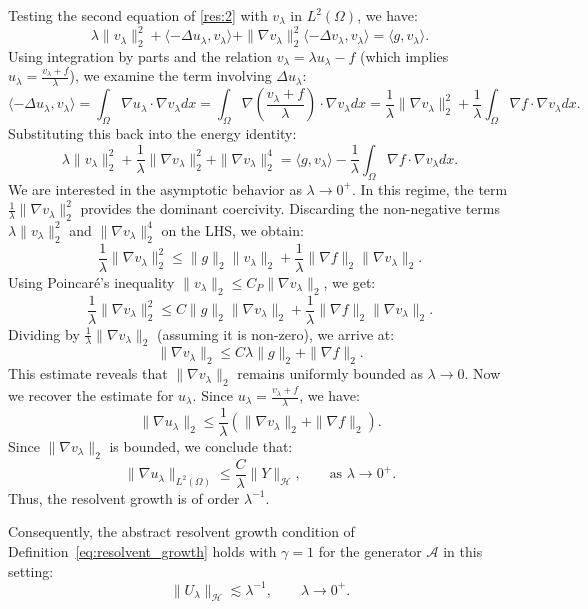 \documentclass[11pt,reqno]{amsart}
\theoremstyle{remark}
\begin{document}
Testing the second equation of \eqref{res:2} with $v_\lambda$ in $L^2(\Omega)$, we have:
\[
\lambda \|v_\lambda\|_2^2 + \langle -\Delta u_\lambda, v_\lambda \rangle + \|\nabla v_\lambda\|_2^2 \langle -\Delta v_\lambda, v_\lambda \rangle = \langle g, v_\lambda \rangle.
\]
Using integration by parts and the relation $v_\lambda = \lambda u_\lambda - f$ (which implies $u_\lambda = \frac{v_\lambda + f}{\lambda}$), we examine the term involving $\Delta u_\lambda$:
\[
\langle -\Delta u_\lambda, v_\lambda \rangle = \int_\Omega \nabla u_\lambda \cdot \nabla v_\lambda dx = \int_\Omega \nabla \left(\frac{v_\lambda+f}{\lambda}\right) \cdot \nabla v_\lambda dx = \frac{1}{\lambda}\|\nabla v_\lambda\|_2^2 + \frac{1}{\lambda}\int_\Omega \nabla f \cdot \nabla v_\lambda dx.
\]
Substituting this back into the energy identity:
\[
\lambda \|v_\lambda\|_2^2 + \frac{1}{\lambda}\|\nabla v_\lambda\|_2^2 + \|\nabla v_\lambda\|_2^4 = \langle g, v_\lambda \rangle - \frac{1}{\lambda}\int_\Omega \nabla f \cdot \nabla v_\lambda dx.
\]
We are interested in the asymptotic behavior as $\lambda \to 0^+$. In this regime, the term $\frac{1}{\lambda}\|\nabla v_\lambda\|_2^2$ provides the dominant coercivity. Discarding the non-negative terms $\lambda \|v_\lambda\|_2^2$ and $\|\nabla v_\lambda\|_2^4$ on the LHS, we obtain:
\[
\frac{1}{\lambda}\|\nabla v_\lambda\|_2^2 \le \|g\|_2 \|v_\lambda\|_2 + \frac{1}{\lambda} \|\nabla f\|_2 \|\nabla v_\lambda\|_2.
\]
Using Poincaré's inequality $\|v_\lambda\|_2 \le C_P \|\nabla v_\lambda\|_2$, we get:
\[
\frac{1}{\lambda}\|\nabla v_\lambda\|_2^2 \le C \|g\|_2 \|\nabla v_\lambda\|_2 + \frac{1}{\lambda} \|\nabla f\|_2 \|\nabla v_\lambda\|_2.
\]
Dividing by $\frac{1}{\lambda}\|\nabla v_\lambda\|_2$ (assuming it is non-zero), we arrive at:
\[
\|\nabla v_\lambda\|_2 \le C \lambda \|g\|_2 + \|\nabla f\|_2.
\]
This estimate reveals that $\|\nabla v_\lambda\|_2$ remains uniformly bounded as $\lambda \to 0$.
Now we recover the estimate for $u_\lambda$. Since $u_\lambda = \frac{v_\lambda+f}{\lambda}$, we have:
\[
\|\nabla u_\lambda\|_2 \le \frac{1}{\lambda} \left( \|\nabla v_\lambda\|_2 + \|\nabla f\|_2 \right).
\]
Since $\|\nabla v_\lambda\|_2$ is bounded, we conclude that:
\begin{equation}\label{est:grad_u}
\|\nabla u_\lambda\|_{L^2(\Omega)} \le \frac{C}{\lambda}\|Y\|_{\mathcal{H}}, \qquad \text{as }\lambda\to0^+.
\end{equation}
Thus, the resolvent growth is of order $\lambda^{-1}$.

Consequently, the abstract resolvent growth condition of Definition~\ref{eq:resolvent_growth}
holds with $\gamma=1$ for the generator $\mathcal A$ in this setting:
\begin{equation}\label{est:final_resolvent}
\|U_\lambda\|_{\mathcal H}\lesssim \lambda^{-1},
\qquad \lambda\to0^+.
\end{equation}
\end{document}
